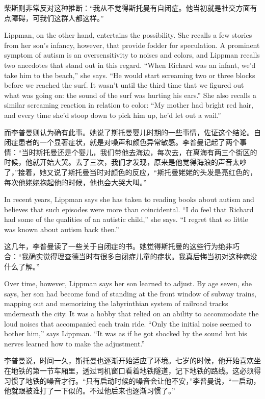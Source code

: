 \ifdefined\chs
柴斯则非常反对这种推断：``我从不觉得斯托曼有自闭症。他当初就是社交方面有点障碍，可我们这群人都这样。''
\fi

\ifdefined\eng
Lippman, on the other hand, entertains the possibility. She recalls a few stories from her son's infancy, however, that provide fodder for speculation. A prominent symptom of autism is an oversensitivity to noises and colors, and Lippman recalls two anecdotes that stand out in this regard. ``When Richard was an infant, we'd take him to the beach,'' she says. ``He would start screaming two or three blocks before we reached the surf. It wasn't until the third time that we figured out what was going on: the sound of the surf was hurting his ears.'' She also recalls a similar screaming reaction in relation to color: ``My mother had bright red hair, and every time she'd stoop down to pick him up, he'd let out a wail.''
\fi

\ifdefined\chs
而李普曼则认为确有此事。她说了斯托曼婴儿时期的一些事情，佐证这个结论。自闭症患者的一个显著症状，就是对噪声和颜色异常敏感。李普曼记起了两个事情：``当时斯托曼还是个婴儿，我们带他去海边，每次去，在离海有两三个街区的时候，他就开始大哭。去了三次，我们才发现，原来是他觉得海浪的声音太吵了，''接着，她又说了斯托曼当时对颜色的反应，``斯托曼姥姥的头发是亮红色的，每次他姥姥抱起他的时候，他也会大哭大叫。''
\fi

\ifdefined\eng
In recent years, Lippman says she has taken to reading books about autism and believes that such episodes were more than coincidental. ``I do feel that Richard had some of the qualities of an autistic child,'' she says. ``I regret that so little was known about autism back then.''
\fi

\ifdefined\chs
这几年，李普曼读了一些关于自闭症的书。她觉得斯托曼的这些行为绝非巧合：``我确实觉得理查德当时有很多自闭症儿童的症状。我真后悔当初对这种病没什么了解。''
\fi

\ifdefined\eng
Over time, however, Lippman says her son learned to adjust. By age seven, she says, her son had become fond of standing at the front window of subway trains, mapping out and memorizing the labyrinthian system of railroad tracks underneath the city. It was a hobby that relied on an ability to accommodate the loud noises that accompanied each train ride. ``Only the initial noise seemed to bother him,'' says Lippman. ``It was as if he got shocked by the sound but his nerves learned how to make the adjustment.''
\fi

\ifdefined\chs
李普曼说，时间一久，斯托曼也逐渐开始适应了环境。七岁的时候，他开始喜欢坐在地铁的第一节车厢里，透过司机窗口看着地铁隧道，记下地铁的路线。这必须得习惯了地铁的噪音才行。``只有启动时候的噪音会让他不安，''李普曼说，``一启动，他就跟被谁打了一下似的。不过他后来也逐渐习惯了。''
\fi

